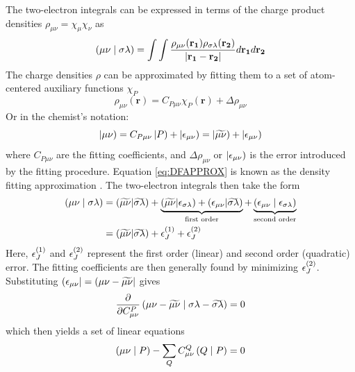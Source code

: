 The two-electron integrals can be expressed in terms of the charge product densities $\rho_{\mu\nu} = \chi_{\mu} \chi_{\nu}$ as
\begin{equation}
\left( \mu\nu \mid \sigma\lambda \right) = \int \int \frac{\rho_{\mu\nu}(\mathbf{r_1}) \rho_{\sigma\lambda}(\mathbf{r_2}) }{\left\lvert \mathbf{r_1} - \mathbf{r_2} \right\rvert} d\mathbf{r_1} d\mathbf{r_2}
\end{equation}
The charge densities $\rho$ can be approximated by fitting them to a set of atom-centered auxiliary functions $\chi_P$
\begin{equation}
\rho_{\mu\nu}(\mathbf{r}) = C_{P\mu\nu} \chi_{P}(\mathbf{r}) + \Delta \rho_{\mu\nu}
\end{equation}
\noindent Or in the chemist's notation:
\begin{equation}
\left\lvert \mu\nu \right) = C_{P\mu\nu} \left\lvert P \right) + \left\lvert \epsilon_{\mu\nu} \right) = \left\lvert \widetilde{\smash{\mu\nu}} \right) + \left\lvert \epsilon_{\mu\nu} \right)
\label{eq:DFAPPROX}
\end{equation}
\noindent where $C_{P\mu\nu}$ are the fitting coefficients, and $\Delta \rho_{\mu\nu}$ or $\left\lvert \epsilon_{\mu\nu} \right)$ is the error introduced by the fitting procedure. Equation \ref{eq:DFAPPROX} is known as the density fitting approximation \cite{Whi1973,Bae1973,Vah1993,Sky2000}. The two-electron integrals then take the form
\begin{equation}
\begin{split}
\left( \mu\nu \mid \sigma\lambda \right) &= (\widetilde{\smash{\mu\nu}}|\widetilde{\smash{\sigma\lambda}}) +  \underbrace{(\widetilde{\smash{\mu\nu}}|\epsilon_{\sigma\lambda}) + (\epsilon_{\mu\nu}|\widetilde{\smash{\sigma\lambda}})}_\textrm{first order} + \underbrace{\left( \epsilon_{\mu\nu} \mid \epsilon_{\sigma\lambda} \right)}_\textrm{second order} \\
&= (\widetilde{\smash{\mu\nu}}|\widetilde{\smash{\sigma\lambda}}) + \epsilon_J^{(1)} + \epsilon_J^{(2)} 
\end{split}
\label{eq:DFERROR}
\end{equation}
\noindent Here, $\epsilon_J^{(1)}$ and $\epsilon_J^{(2)}$ represent the first order (linear) and second order (quadratic) error. The fitting coefficients are then generally found by minimizing $\epsilon_J^{(2)}$. Substituting $\left( \smash{\epsilon_{\mu\nu}} \right\rvert = \left( \smash{\mu\nu - \widetilde{\smash{\mu\nu}}} \right\rvert$ gives
\begin{equation}
\frac{\partial}{\partial C^P_{\mu\nu}} \left( \smash{\mu\nu - \widetilde{\smash{\mu\nu}}} \mid \smash{\sigma\lambda - \widetilde{\smash{\sigma\lambda}}}\right) = 0
\end{equation}
\noindent which then yields a set of linear equations
\begin{equation}
\left( \smash{\mu\nu} \mid \smash{P}\right) - \sum_Q C^Q_{\mu\nu} \left( \smash{Q} \mid \smash{P}\right) = 0 
\label{eq:DFLLS}
\end{equation}
